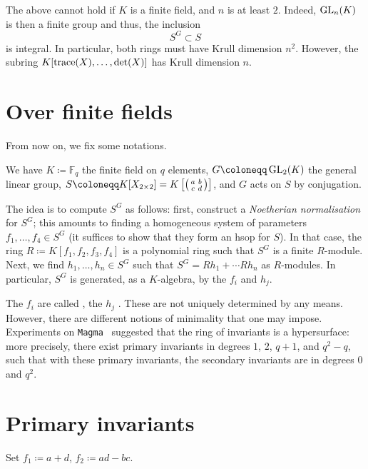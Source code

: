 \documentclass[12pt]{article}
\begin{document}
	The above cannot hold if $K$ is a finite field, and $n$ is at least $2$. 
	Indeed, $\operatorname{GL}_{n}(K)$ is then a finite group and thus, the inclusion
	\begin{equation*} 
		S^{G} \subset S
	\end{equation*}
	is integral. In particular, both rings must have Krull dimension $n^{2}$. 
	However, the subring $K[\operatorname{trace}(X), \ldots, \det(X)]$ has Krull dimension $n$.

\section{Over finite fields}
	
	From now on, we fix some notations.
	\begin{tcolorbox}
		We have $K \coloneqq \mathbb{F}_{q}$ the finite field on $q$ elements, 
		$G \coloneqq \GL_{2}(K)$ the general linear group, 
		$S \coloneqq K[X_{2 \times 2}] = K\left[\smatrix{a & b \\ c & d}\right]$, 
		and $G$ acts on $S$ by conjugation. 
	\end{tcolorbox}

	The idea is to compute $S^{G}$ as follows: 
	first, construct a \emph{Noetherian normalisation} for $S^{G}$; this amounts to finding a homogeneous system of parameters $f_{1}, \ldots, f_{4} \in S^{G}$ (it suffices to show that they form an hsop for $S$). 
	In that case, the ring $R \coloneqq K[f_{1}, f_{2}, f_{3}, f_{4}]$ is a polynomial ring such that $S^{G}$ is a finite $R$-module. 
	Next, we find $h_{1}, \ldots, h_{n} \in S^{G}$ such that $S^{G} = R h_{1} + \cdots R h_{n}$ as $R$-modules. 
	In particular, $S^{G}$ is generated, as a $K$-algebra, by the $f_{i}$ and $h_{j}$.

	The $f_{i}$ are called , the $h_{j}$ . 
	These are not uniquely determined by any means. 
	However, there are different notions of minimality that one may impose. 
	Experiments on \texttt{Magma}~\Cite{Magma} suggested that the ring of invariants is a hypersurface: more precisely, there exist primary invariants in degrees $1$, $2$, $q+1$, and $q^{2} - q$, such that with these primary invariants, the secondary invariants are in degrees $0$ and $q^{2}$.

\section{Primary invariants}
	
	\begin{tcolorbox}
		Set $f_{1} \coloneqq a + d$, $f_{2} \coloneqq ad - bc$.
	\end{tcolorbox}
\end{document}
